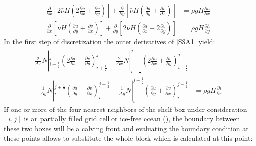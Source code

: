 \documentclass[a4paper,10pt]{article}
\begin{document}
\begin{align}
\frac{\partial}{\partial x}\left[ 2\bar\nu H\left( 2\frac{\partial u}{\partial x} + \frac{\partial v}{\partial y} \right)\right] + \frac{\partial }{\partial y}\left[\bar\nu H\left(\frac{\partial u}{\partial y}+\frac{\partial v}{\partial x}  \right) \right] &= \rho gH \frac{\partial h}{\partial x} \label{SSA1} \\
\frac{\partial}{\partial x}\left[ \bar\nu H\left( \frac{\partial u}{\partial y} + \frac{\partial v}{\partial x} \right)\right] + \frac{\partial }{\partial y}\left[2\bar\nu H\left(\frac{\partial u}{\partial x}+2\frac{\partial v}{\partial y}  \right) \right] &= \rho gH \frac{\partial h}{\partial y} \label{SSA2}
\end{align}
\noindent In the first step of discretization the outer derivatives of \eqref{SSA1} yield:
\begin{align}
\frac{2}{\Delta x}N|_{i+\frac{1}{2}}^j\left( 2\frac{\partial u}{\partial x} + \frac{\partial v}{\partial y} \right)_{i+\frac{1}{2}}^j
- \frac{2}{\Delta x}N|_{i-\frac{1}{2}}^j\left( 2\frac{\partial u}{\partial x} + \frac{\partial v}{\partial y} \right)_{i-\frac{1}{2}}^j \nonumber \\
+ \frac{1}{\Delta y}N|_i^{j+\frac{1}{2}}\left(\frac{\partial u}{\partial y}+\frac{\partial v}{\partial x}\right)_i^{j+\frac{1}{2}} 
- \frac{1}{\Delta y}N|_i^{j-\frac{1}{2}}\left(\frac{\partial u}{\partial y}+\frac{\partial v}{\partial x}\right)_i^{j-\frac{1}{2}} 
&= \rho gH \frac{\partial h}{\partial x} \label{SSA1_dis1} 
\end{align}
If one or more of the four nearest neighbors of the shelf box under consideration $[i,j]$ is an partially filled grid cell or ice-free ocean (\cite{Albrecht_Martin10}), the boundary between these two boxes will be a calving front and evaluating the boundary condition at these points allows to substitute the whole block which is calculated at this point:
\end{document}
